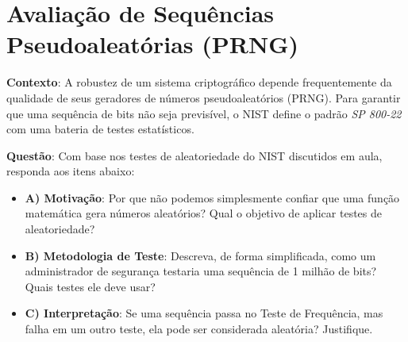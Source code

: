 \section{Avaliação de Sequências Pseudoaleatórias (PRNG)}

\textbf{Contexto}:
A robustez de um sistema criptográfico depende frequentemente da qualidade de seus geradores de números pseudoaleatórios (PRNG). Para garantir que uma sequência de bits não seja previsível, o NIST define o padrão \textit{SP 800-22} com uma bateria de testes estatísticos.

\textbf{Questão}:
Com base nos testes de aleatoriedade do NIST discutidos em aula, responda aos itens abaixo:

\begin{itemize}
    \item \textbf{A) Motivação}: Por que não podemos simplesmente confiar que uma função matemática gera números aleatórios? Qual o objetivo de aplicar testes de aleatoriedade?



    \item \textbf{B) Metodologia de Teste}: Descreva, de forma simplificada, como um administrador de segurança testaria uma sequência de 1 milhão de bits? Quais testes ele deve usar?



    \item \textbf{C) Interpretação}: Se uma sequência passa no Teste de Frequência, mas falha em um outro teste, ela pode ser considerada aleatória? Justifique.


\end{itemize}



